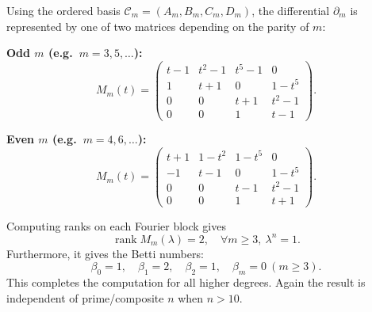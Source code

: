 \documentclass[11pt]{amsart}
\newcommand{\rank}{\operatorname{rank}}
\theoremstyle{plain}
\theoremstyle{definition}
\numberwithin{equation}{section}
\begin{document}
Using the ordered basis $\mathcal{C}_m=(A_m,B_m,C_m,D_m)$, the differential
$\partial_m$ is represented by one of two matrices depending on the parity of $m$:

\medskip\noindent
\textbf{Odd $m$ (e.g.\ $m=3,5,\dots$):}
\[
M_m(t)=
\begin{pmatrix}
t-1 & t^2-1 & t^5-1 & 0\\
1 & t+1 & 0 & 1-t^5\\
0 & 0 & t+1 & t^2-1\\
0 & 0 & 1 & t-1
\end{pmatrix}.
\]

\medskip\noindent
\textbf{Even $m$ (e.g.\ $m=4,6,\dots$):}
\[
M_m(t)=
\begin{pmatrix}
t+1 & 1-t^2 & 1-t^5 & 0\\
-1 & t-1 & 0 & 1-t^5\\
0 & 0 & t-1 & t^2-1\\
0 & 0 & 1 & t+1
\end{pmatrix}.
\]

Computing ranks on each Fourier block gives 
\[\rank M_m(\lambda)=2,\quad \forall m\ge 3,~\lambda^n=1.\]
Furthermore, it gives the Betti numbers:
\[
\beta_0=1,\quad \beta_1=2,\quad \beta_2=1,\quad \beta_m=0\ (m\ge 3).
\]
This completes the computation for all higher degrees. Again the result is independent of prime/composite $n$ when $n>10$.



\bigskip
\end{document}
